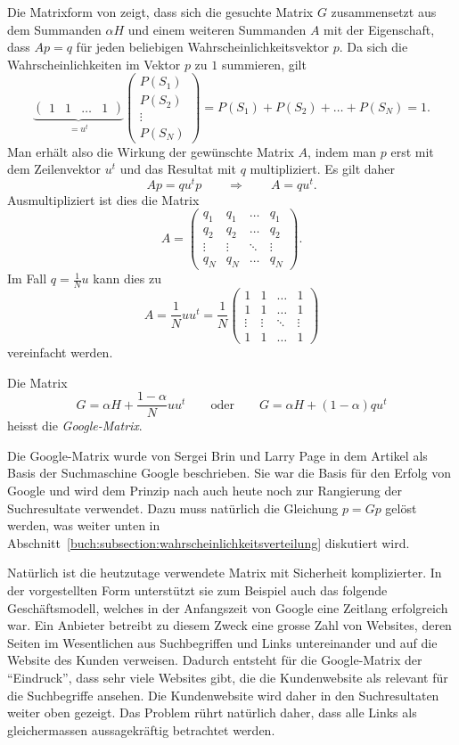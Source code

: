 Die Matrixform von
\label{buch:google:eqn:composed}
zeigt, dass sich die gesuchte Matrix $G$ zusammensetzt aus dem Summanden
$\alpha H$ und einem weiteren Summanden $A$ mit der Eigenschaft, dass
$Ap = q$ für jeden beliebigen Wahrscheinlichkeitsvektor $p$.
Da sich die Wahrscheinlichkeiten im Vektor $p$ zu $1$ summieren, gilt
\[
\underbrace{
\begin{pmatrix}
1&1&\dots&1
\end{pmatrix}
}_{\displaystyle = u^t}
\begin{pmatrix}
P(S_1)\\
P(S_2)\\
\vdots\\
P(S_N)
\end{pmatrix}
=
P(S_1)+P(S_2)+\dots+P(S_N)=1.
\]
Man erhält also die Wirkung der gewünschte Matrix $A$, indem man $p$
erst mit dem Zeilenvektor $u^t$ und das Resultat mit $q$ multipliziert.
Es gilt daher
\[
Ap = qu^tp
\qquad\Rightarrow\qquad
A=qu^t.
\]
Ausmultipliziert ist dies die Matrix
\[
A=\begin{pmatrix}
q_1&q_1&\dots&q_1\\
q_2&q_2&\dots&q_2\\
\vdots&\vdots&\ddots&\vdots\\
q_N&q_N&\dots&q_N
\end{pmatrix}.
\]
Im Fall $q=\frac1Nu$ kann dies zu
\[
A
=
\frac1N uu^t
=
\frac1N
\begin{pmatrix}
1&1&\dots&1\\
1&1&\dots&1\\
\vdots&\vdots&\ddots&\vdots\\
1&1&\dots&1
\end{pmatrix}
\]
vereinfacht werden.

\begin{definition}
Die Matrix
\[
G
=
\alpha H
+
\frac{1-\alpha}{N}
uu^t
\qquad\text{oder}\qquad
G
=
\alpha H
+
(1-\alpha)qu^t
\]
heisst die
{\em Google-Matrix}.
%
\end{definition}

Die Google-Matrix wurde von Sergei Brin und Larry Page 
in dem Artikel \cite{BRIN1998107} als Basis der Suchmaschine
Google beschrieben.
Sie war die Basis für den Erfolg von Google und wird dem Prinzip nach
auch heute noch zur Rangierung der Suchresultate verwendet.
Dazu muss natürlich die Gleichung $p=Gp$ gelöst werden, was
weiter unten in Abschnitt~\ref{buch:subsection:wahrscheinlichkeitsverteilung}
diskutiert wird.

Natürlich ist die heutzutage verwendete Matrix mit Sicherheit komplizierter.
In der vorgestellten Form unterstützt sie zum Beispiel auch das folgende
Geschäftsmodell, welches in der Anfangszeit von Google eine Zeitlang 
erfolgreich war.
Ein Anbieter betreibt zu diesem Zweck eine grosse Zahl von Websites,
deren Seiten im Wesentlichen aus Suchbegriffen und Links untereinander
und auf die Website des Kunden verweisen.
Dadurch entsteht für die Google-Matrix der ``Eindruck'', dass sehr viele
Websites gibt, die die Kundenwebsite als relevant für die Suchbegriffe 
ansehen.
Die Kundenwebsite wird daher in den Suchresultaten weiter oben gezeigt.
Das Problem rührt natürlich daher, dass alle Links als gleichermassen
aussagekräftig betrachtet werden.

